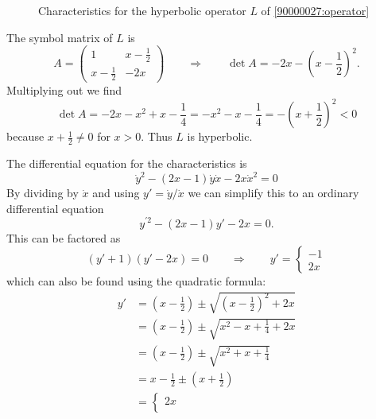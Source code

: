 \begin{loesung}
\begin{figure}
\caption{Characteristics for the hyperbolic operator $L$ of
\eqref{90000027:operator}
\label{90000027:fig}}
\end{figure}
\begin{teilaufgaben}
\item
The symbol matrix of $L$ is
\[
A
=
\begin{pmatrix}
  1       & x-\frac12 \\
x-\frac12 &   -2x
\end{pmatrix}
\qquad\Rightarrow\qquad
\det A
=
-2x -(x-{\textstyle\frac12})^2.
\]
Multiplying out we find
\[
\det A
=
-2x-x^2 +x-\frac14
=
-x^2-x-\frac14
=
-(x+{\textstyle\frac12})^2
<
0
\]
because $x+\frac12\ne 0$ for $x>0$.
Thus  $L$ is hyperbolic.
\item
The differential equation for the characteristics is
\[
\dot{y}^2 -(2x-1) \dot{y}\dot{x} - 2x\dot{x}^2 = 0
\]
By dividing by $\dot{x}$ and using $y'=\dot{y}/\dot{x}$ we can simplify
this to an ordinary differential equation
\[
y^{\prime 2} -(2x-1)y' - 2x = 0.
\]
This can be factored as
\[
(y'+1)(y'-2x) = 0
\qquad\Rightarrow\qquad
y'
=
\begin{cases}
-1\\
2x
\end{cases}
\]
which can also be found using the quadratic formula:
\begin{align*}
y'
&=
(x-{\textstyle\frac12}) \pm \sqrt{(x-{\textstyle\frac12})^2+2x}
\\
&=
(x-{\textstyle\frac12}) \pm \sqrt{x^2-x+\frac14+2x}
\\
&=
(x-{\textstyle\frac12}) \pm \sqrt{x^2+x+\frac14}
\\
&=
x-{\textstyle\frac12} \pm (x+{\textstyle\frac12})
\\
&=
\begin{cases}
2x  \\

\end{cases}
\end{align*}
\end{teilaufgaben}
\end{loesung}
